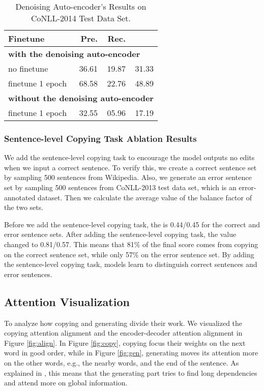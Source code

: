 \documentclass[11pt,a4paper]{article}
\begin{document}
\begin{table}[t!]
\begin{center}
\begin{tabular} {|l|r|r|r|}
\hline \bf Finetune & \bf Pre. & \bf Rec. & \bf  \\ 
\hline \multicolumn{4}{|l|}{\bf with the denoising auto-encoder} \\ \hline
no finetune & 36.61 & 19.87 & 31.33 \\
finetune 1 epoch & 68.58 & 22.76 & 48.89 \\
\hline \multicolumn{4}{|l|}{\bf without the denoising auto-encoder} \\ \hline
finetune 1 epoch & 32.55 & 05.96 & 17.19 \\
\hline
\end{tabular}
\end{center}
\caption{\label{finetune} Denoising Auto-encoder's Results on CoNLL-2014 Test Data Set.}
\end{table}


\subsubsection{Sentence-level Copying Task Ablation Results} 

We add the sentence-level copying task to encourage the model outputs no edits when we input a correct sentence. To verify this, we create a correct sentence set by sampling 500 sentences from Wikipedia. Also, we generate an error sentence set by sampling 500 sentences from CoNLL-2013 test data set, which is an error-annotated dataset. Then we calculate the average value of the balance factor  of the two sets. 

Before we add the sentence-level copying task, the  is 0.44/0.45 for the correct and error sentence sets. After adding the sentence-level copying task, the value changed to 0.81/0.57. This means that 81\% of the final score comes from copying on the correct sentence set, while only 57\% on the error sentence set. By adding the sentence-level copying task, models learn to distinguish correct sentences and error sentences.


\subsection{Attention Visualization}

To analyze how copying and generating divide their work. We visualized the copying attention alignment and the encoder-decoder attention alignment in Figure \ref{fig:align}. In Figure \ref{fig:copy}, copying focus their weights on the next word in good order, while in Figure \ref{fig:gen}, generating moves its attention more on the other words, e.g., the nearby words, and the end of the sentence. As explained in \cite{raganato2018analysis}, this means that the generating part tries to find long dependencies and attend more on global information.
\end{document}
